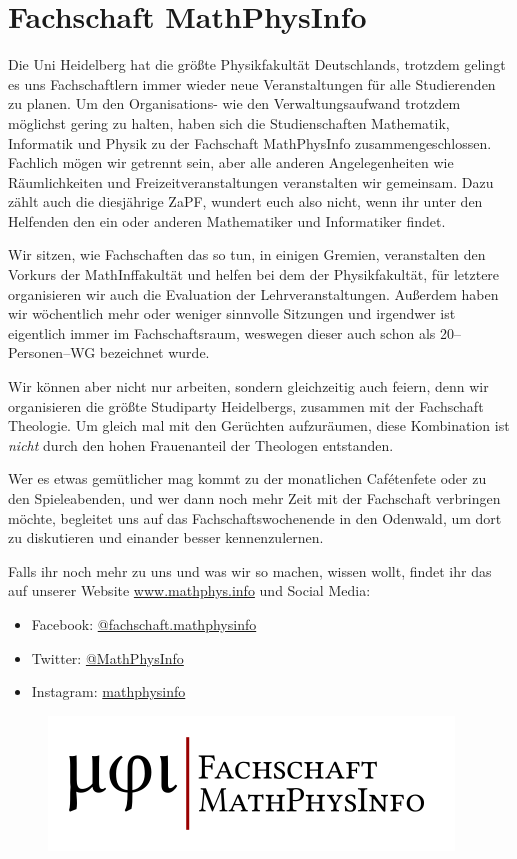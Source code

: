 
\section{Fachschaft MathPhysInfo}

Die Uni Heidelberg hat die größte Physikfakultät Deutschlands, trotzdem gelingt es uns Fachschaftlern immer wieder neue Veranstaltungen für alle Studierenden zu planen. Um den Organisations- wie den Verwaltungsaufwand trotzdem möglichst gering zu halten, haben sich die Studienschaften Mathematik, Informatik und Physik zu der Fachschaft MathPhysInfo zusammengeschlossen. Fachlich mögen wir getrennt sein, aber alle anderen Angelegenheiten wie Räumlichkeiten und Freizeitveranstaltungen veranstalten wir gemeinsam. Dazu zählt auch die diesjährige ZaPF, wundert euch also nicht, wenn ihr unter den Helfenden den ein oder anderen Mathematiker und Informatiker findet.

Wir sitzen, wie Fachschaften das so tun, in einigen Gremien, veranstalten den Vorkurs der MathInffakultät und helfen bei dem der Physikfakultät, für letztere organisieren wir auch die Evaluation der Lehrveranstaltungen. Außerdem haben wir wöchentlich mehr oder weniger sinnvolle Sitzungen und irgendwer ist eigentlich immer im Fachschaftsraum, weswegen dieser auch schon als 20--Personen--WG bezeichnet wurde.

Wir können aber nicht nur arbeiten, sondern gleichzeitig auch feiern, denn wir organisieren die größte Studiparty Heidelbergs, zusammen mit der Fachschaft Theologie. Um gleich mal mit den Gerüchten aufzuräumen, diese Kombination ist \textit{nicht} durch den hohen Frauenanteil der Theologen entstanden.

Wer es etwas gemütlicher mag kommt zu der monatlichen Cafétenfete oder zu den Spieleabenden, und wer dann noch mehr Zeit mit der Fachschaft verbringen möchte, begleitet uns auf das Fachschaftswochenende in den Odenwald, um dort zu diskutieren und einander besser kennenzulernen.

Falls ihr noch mehr zu uns und was wir so machen, wissen wollt, findet ihr das auf unserer Website \url{www.mathphys.info} und Social Media: 
\begin{itemize}
\item[\faFacebookSquare] Facebook: \href{https://www.facebook.com/fachschaft.mathphysinfo}{@fachschaft.mathphysinfo}
\item[\faTwitterSquare] Twitter: \href{https://twitter.com/MathPhysInfo}{@MathPhysInfo}
\item[\faInstagram] Instagram: \href{https://www.instagram.com/mathphysinfo/}{mathphysinfo}
\end{itemize}


\begin{figure}[h]
\centering
\includegraphics[width=.5\textwidth]{media/mathphysinfologo}
\end{figure}